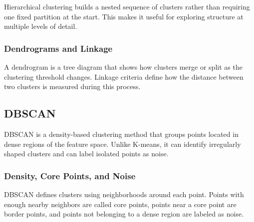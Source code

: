 \documentclass[12pt,letter]{article}
\begin{document}
Hierarchical clustering builds a nested sequence of clusters rather than requiring one fixed partition at the start. This makes it useful for exploring structure at multiple levels of detail.

\subsubsection{Dendrograms and Linkage}

A dendrogram is a tree diagram that shows how clusters merge or split as the clustering threshold changes. Linkage criteria define how the distance between two clusters is measured during this process.


\subsection{DBSCAN}

DBSCAN is a density-based clustering method that groups points located in dense regions of the feature space. Unlike K-means, it can identify irregularly shaped clusters and can label isolated points as noise.

\subsubsection{Density, Core Points, and Noise}

DBSCAN defines clusters using neighborhoods around each point. Points with enough nearby neighbors are called core points, points near a core point are border points, and points not belonging to a dense region are labeled as noise.
\end{document}

